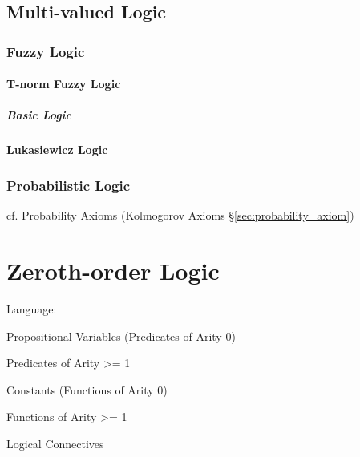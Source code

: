 \subsection{Multi-valued Logic}\label{sec:multi_valued_logic}

\subsubsection{Fuzzy Logic}\label{sec:fuzzy_logic}

\paragraph{T-norm Fuzzy Logic}\label{sec:tnorm_logic}\hfill

\subparagraph{Basic Logic}\label{sec:basic_logic}\hfill



\paragraph{Lukasiewicz Logic}\label{sec:lukasiewicz_logic}\hfill



\subsubsection{Probabilistic Logic}\label{sec:probabilistic_logic}

cf. Probability Axioms (Kolmogorov Axioms \S\ref{sec:probability_axiom})



\section{Zeroth-order Logic}\label{sec:zerothorder_logic}


Language:

Propositional Variables (Predicates of Arity 0)

Predicates of Arity >= 1

Constants (Functions of Arity 0)

Functions of Arity >= 1

Logical Connectives

